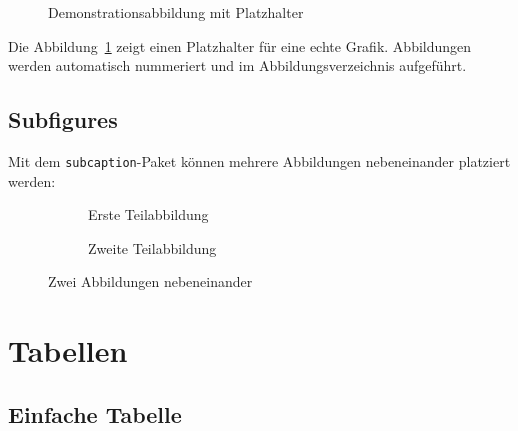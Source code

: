 \begin{figure}[h]
	\centering
	\caption{Demonstrationsabbildung mit Platzhalter}
	\label{fig:demo_abbildung}
\end{figure}

Die Abbildung~\ref{fig:demo_abbildung} zeigt einen Platzhalter für eine echte Grafik. Abbildungen werden automatisch nummeriert und im Abbildungsverzeichnis aufgeführt.

\subsection{Subfigures}
\label{subsec:subfigures}

Mit dem \texttt{subcaption}-Paket können mehrere Abbildungen nebeneinander platziert werden:

\begin{figure}[h]
	\centering
	\begin{subfigure}[b]{0.45\textwidth}
		\centering
		\caption{Erste Teilabbildung}
		\label{fig:sub1}
	\end{subfigure}
	\hfill
	\begin{subfigure}[b]{0.45\textwidth}
		\centering
		\caption{Zweite Teilabbildung}
		\label{fig:sub2}
	\end{subfigure}
	\caption{Zwei Abbildungen nebeneinander}
	\label{fig:subfigures_demo}
\end{figure}

\section{Tabellen}
\label{sec:tabellen_demo}

\subsection{Einfache Tabelle}
\label{subsec:einfache_tabelle}

